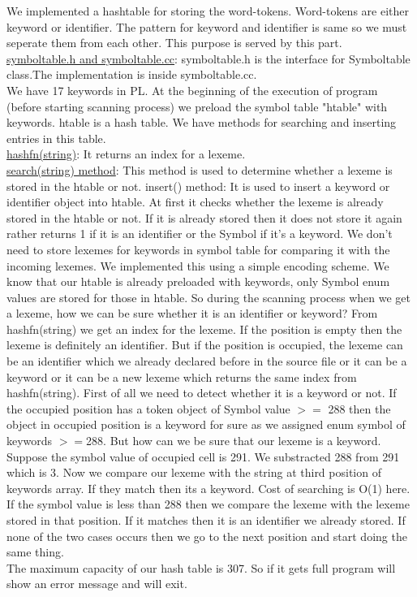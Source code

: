 \documentclass[paper=letter, fontsize=12pt]{scrartcl} %
\begin{document}
We implemented a hashtable for storing the word-tokens. Word-tokens are either keyword or identifier. The pattern for keyword and identifier is same so we must seperate them from each other. This purpose is served by this part.\\
\underline {symboltable.h and symboltable.cc}: symboltable.h  is the interface for Symboltable class.The implementation is inside symboltable.cc.\\
We have 17 keywords in PL. At the beginning of the execution of program (before starting scanning process) we preload the symbol table "htable" with keywords. htable is a hash table.
We have methods for searching and inserting entries in this table.\\
\underline {hashfn(string)}: It returns an index for a lexeme.\\
\underline {search(string) method}: This method is used to  determine whether a lexeme is stored in the htable or not. 
insert() method: It is used to insert a keyword or identifier object into htable. At first it checks whether the lexeme is already stored in the htable or not. If it is already stored then it does not store it again rather returns 1 if it is an identifier or the Symbol if it's a keyword. We don't need to store lexemes for keywords in symbol table for comparing it with the incoming lexemes. We implemented this using a simple encoding scheme. We know that our htable is already preloaded with keywords, only Symbol enum values are stored for those in htable. So during the scanning process when we get a lexeme, how we can be sure whether it is an identifier or keyword? From hashfn(string) we get an index for the lexeme. If the position is empty then the lexeme is definitely an identifier. But if the position is occupied, the lexeme can be an identifier which we already declared before in the source file or it can be a keyword or it can be a new lexeme which returns the same index from hashfn(string).
First of all we need to detect whether it is a keyword or not. If the occupied position has a token object of Symbol value $>=$ 288 then the object in occupied position is a keyword for sure as we assigned enum symbol of keywords $>=$288. But how can we be sure that our lexeme is a keyword. Suppose the symbol value of occupied cell is 291. We substracted 288 from 291 which is 3. Now we compare our lexeme with the string at third position of keywords array. If they match then its a keyword. Cost of searching is O(1) here. If the symbol value is less than 288 then we compare the lexeme with the lexeme stored in that position. If it matches then it is an identifier we already stored. If none of the two cases occurs then we go to the next position and start doing the same thing.\\

The maximum capacity of our hash table is 307. So if it gets full program will show an error message and will exit.  \\
\end{document}
